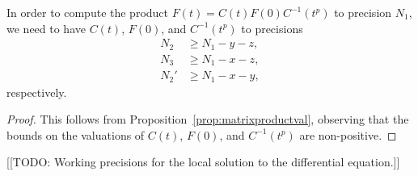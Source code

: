 \begin{cor}
In order to compute the product $F(t) = C(t) F(0) C^{-1}(t^p)$ to 
precision $N_1$, we need to have $C(t)$, $F(0)$, and $C^{-1}(t^p)$ 
to precisions 
\begin{align*}
N_2  & \geq N_1 - y - z, \\
N_3  & \geq N_1 - x - z, \\
N_2' & \geq N_1 - x - y,
\end{align*}
respectively.
\end{cor}

\begin{proof}
This follows from Proposition~\ref{prop:matrixproductval}, observing 
that the bounds on the valuations of $C(t)$, $F(0)$, and $C^{-1}(t^p)$ 
are non-positive.
\end{proof}

[[TODO:  Working precisions for the local solution to the differential equation.]]
